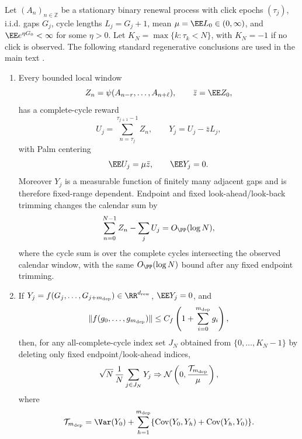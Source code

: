 \begin{proposition}\label{prop:standard-complete-cycle-separated-batch-facts-main}
Let \((A_n)_{n\in\mathbb Z}\) be a stationary binary renewal process with
click epochs \((\tau_j)\), i.i.d. gaps \(G_j\), cycle lengths
\(L_j=G_j+1\), mean \(\mu=\EE L_0\in(0,\infty)\), and
\(\EE e^{\eta G_0}<\infty\) for some \(\eta>0\).  Let
\(K_N=\max\{k:\tau_k<N\}\), with \(K_N=-1\) if no click is observed.  The
following standard regenerative conclusions are used in the main text
\cite{GlynnIglehart1990STS,AsmussenGlynn2007,GlynnWhitt1991BatchMeans,
VatsFlegalJones2019Multivariate}.
\begin{enumerate}[label=\textup{(\alph*)},leftmargin=2.4em,itemsep=0.25em]
\item Every bounded local window
\[
Z_n=\psi(A_{n-r},\ldots,A_{n+\ell}),\qquad \bar z=\EE Z_0,
\]
has a complete-cycle reward
\[
U_j=\sum_{n=\tau_j}^{\tau_{j+1}-1}Z_n,\qquad
Y_j=U_j-\bar zL_j,
\]
with Palm centering
\begin{equation}\label{eq:local-window-palm-inversion-main}
\EE U_j=\mu\bar z,\qquad \EE Y_j=0 .
\end{equation}
Moreover \(Y_j\) is a measurable function of finitely many adjacent gaps and
is therefore fixed-range dependent.  Endpoint and fixed look-ahead/look-back
trimming changes the calendar sum by
\begin{equation}\label{eq:local-window-endpoint-main}
\sum_{n=0}^{N-1}Z_n-\sum_j U_j=O_{\PP}(\log N),
\end{equation}
where the cycle sum is over the complete cycles intersecting the observed
calendar window, with the same \(O_{\PP}(\log N)\) bound after any fixed
endpoint trimming.

\item If \(Y_j=f(G_j,\ldots,G_{j+m_{\rm dep}})\in\RR^{d_{\rm rew}}\),
\(\EE Y_j=0\), and
\[
\|f(g_0,\ldots,g_{m_{\rm dep}})\|
\le C_f\left(1+\sum_{i=0}^{m_{\rm dep}}g_i\right),
\]
then, for any all-complete-cycle index set \(J_N\) obtained from
\(\{0,\ldots,K_N-1\}\) by deleting only fixed endpoint/look-ahead indices,
\[
\sqrt N\,\frac1N\sum_{j\in J_N}Y_j
\Rightarrow
\mathcal N\left(0,\frac{\mathcal T_{m_{\rm dep}}}{\mu}\right),
\]
where
\[
\mathcal T_{m_{\rm dep}}
=\Var(Y_0)+
\sum_{h=1}^{m_{\rm dep}}
\{\operatorname{Cov}(Y_0,Y_h)+\operatorname{Cov}(Y_h,Y_0)\}.
\]


\end{enumerate}
\end{proposition}

